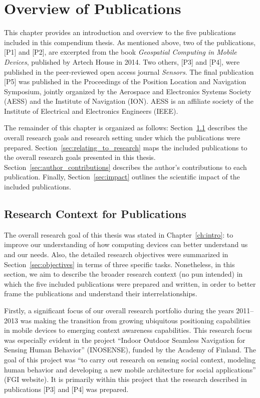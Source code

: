 \chapter{Overview of Publications}
\label{ch:overview_of_publications}

This chapter provides an introduction and overview to the five publications included in this compendium thesis. As mentioned above, two of the publications, [P1] and [P2], are excerpted from the book \emph{Geospatial Computing in Mobile Devices}, published by Artech House in 2014. Two others, [P3] and [P4], were published in the peer-reviewed open access journal \emph{Sensors}. The final publication [P5] was published in the Proceedings of the Position Location and Navigation Symposium, jointly organized by the Aerospace and Electronics Systems Society (AESS) and the Institute of Navigation (ION). AESS is an affiliate society of the Institute of Electrical and Electronics Engineers (IEEE).

The remainder of this chapter is organized as follows: Section~\ref{sec:overall_research} describes the overall research goals and research setting under which the publications were prepared. Section~\ref{sec:relating_to_research} maps the included publications to the overall research goals presented in this thesis. Section~\ref{sec:author_contributions} describes the author's contributions to each publication. Finally, Section~\ref{sec:impact} outlines the scientific impact of the included publications.

\section{Research Context for Publications}
\label{sec:overall_research}

The overall research goal of this thesis was stated in Chapter~\ref{ch:intro}: to improve our understanding of how computing devices can better understand us and our needs. Also, the detailed research objectives were summarized in Section~\ref{sec:objectives} in terms of three specific tasks. Nonetheless, in this section, we aim to describe the broader research context (no pun intended) in which the five included publications were prepared and written, in order to better frame the publications and understand their interrelationships.

Firstly, a significant focus of our overall research portfolio during the years 2011--2013 was making the transition from growing ubiquitous positioning capabilities in mobile devices to emerging context awareness capabilities. This research focus was especially evident in the project ``Indoor Outdoor Seamless Navigation for Sensing Human Behavior'' (INOSENSE), funded by the Academy of Finland. The goal of this project was ``to carry out research on sensing social context, modeling human behavior and developing a new mobile architecture for social applications'' (FGI website). It is primarily within this project that the research described in publications [P3] and [P4] was prepared.

